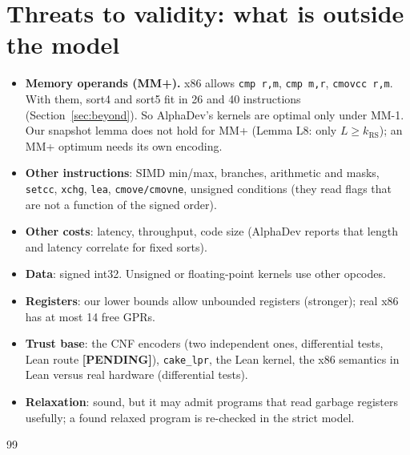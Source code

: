 \documentclass[11pt]{article}
\theoremstyle{remark}\newtheorem{remark}[theorem]{Remark}
\newcommand{\pending}{\textbf{[PENDING]}}
\begin{document}
\section{Threats to validity: what is outside the model}\label{sec:threats}
\begin{itemize}
\item \textbf{Memory operands (MM+).} x86 allows \texttt{cmp r,m}, \texttt{cmp m,r}, \texttt{cmovcc r,m}. With them, sort4 and sort5
fit in 26 and 40 instructions (Section~\ref{sec:beyond}). So AlphaDev's kernels are optimal only under MM-1. Our snapshot
lemma does not hold for MM+ (Lemma L8: only $L \ge k_{\mathrm{RS}}$); an MM+ optimum needs its own encoding.
\item \textbf{Other instructions}: SIMD min/max, branches, arithmetic and masks, \texttt{setcc}, \texttt{xchg}, \texttt{lea},
\texttt{cmove/cmovne}, unsigned conditions (they read flags that are not a function of the signed order).
\item \textbf{Other costs}: latency, throughput, code size (AlphaDev reports that length and latency correlate for fixed sorts).
\item \textbf{Data}: signed int32. Unsigned or floating-point kernels use other opcodes.
\item \textbf{Registers}: our lower bounds allow unbounded registers (stronger); real x86 has at most 14 free GPRs.
\item \textbf{Trust base}: the CNF encoders (two independent ones, differential tests, Lean route \pending), \texttt{cake\_lpr},
the Lean kernel, the x86 semantics in Lean versus real hardware (differential tests).
\item \textbf{Relaxation}: sound, but it may admit programs that read garbage registers usefully; a found relaxed program is
re-checked in the strict model.
\end{itemize}



\appendix


\begin{thebibliography}{99}

\end{thebibliography}
\end{document}
